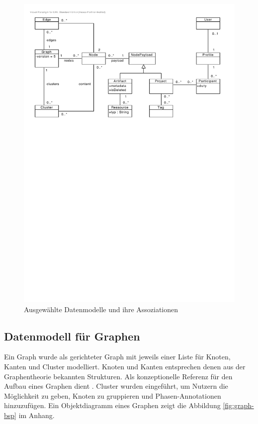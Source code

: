 \begin{figure}[h]  
  \centering     
  \includegraphics[width=1.0\textwidth]{img/models.pdf}  
   \caption{Ausgewählte Datenmodelle und ihre Assoziationen}
  \label{fig:models} 
\end{figure}

\subsection{Datenmodell für Graphen}
Ein Graph wurde als gerichteter Graph mit jeweils einer Liste für Knoten, Kanten und Cluster modelliert. Knoten und Kanten entsprechen denen aus der Graphentheorie bekannten Strukturen. Als konzeptionelle Referenz für den Aufbau eines Graphen dient \cite[p.~531]{corman}. Cluster wurden eingeführt, um Nutzern die Möglichkeit zu geben, Knoten zu gruppieren und Phasen-Annotationen hinzuzufügen. Ein Objektdiagramm eines Graphen zeigt die Abbildung \ref{fig:graph-bsp} im Anhang.

